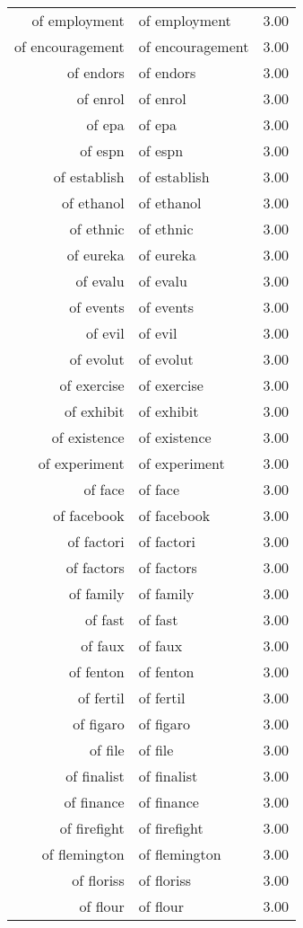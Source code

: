 \begin{table}[ht]
\begin{tabular}{rlr}
  of employment & of employment & 3.00 \\ 
  of encouragement & of encouragement & 3.00 \\ 
  of endors & of endors & 3.00 \\ 
  of enrol & of enrol & 3.00 \\ 
  of epa & of epa & 3.00 \\ 
  of espn & of espn & 3.00 \\ 
  of establish & of establish & 3.00 \\ 
  of ethanol & of ethanol & 3.00 \\ 
  of ethnic & of ethnic & 3.00 \\ 
  of eureka & of eureka & 3.00 \\ 
  of evalu & of evalu & 3.00 \\ 
  of events & of events & 3.00 \\ 
  of evil & of evil & 3.00 \\ 
  of evolut & of evolut & 3.00 \\ 
  of exercise & of exercise & 3.00 \\ 
  of exhibit & of exhibit & 3.00 \\ 
  of existence & of existence & 3.00 \\ 
  of experiment & of experiment & 3.00 \\ 
  of face & of face & 3.00 \\ 
  of facebook & of facebook & 3.00 \\ 
  of factori & of factori & 3.00 \\ 
  of factors & of factors & 3.00 \\ 
  of family & of family & 3.00 \\ 
  of fast & of fast & 3.00 \\ 
  of faux & of faux & 3.00 \\ 
  of fenton & of fenton & 3.00 \\ 
  of fertil & of fertil & 3.00 \\ 
  of figaro & of figaro & 3.00 \\ 
  of file & of file & 3.00 \\ 
  of finalist & of finalist & 3.00 \\ 
  of finance & of finance & 3.00 \\ 
  of firefight & of firefight & 3.00 \\ 
  of flemington & of flemington & 3.00 \\ 
  of floriss & of floriss & 3.00 \\ 
  of flour & of flour & 3.00 \\ 

\end{tabular}
\end{table}
